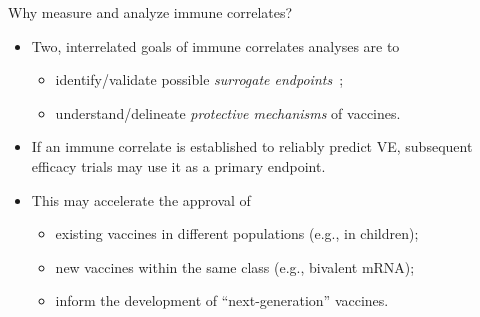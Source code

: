 \documentclass{beamer}
\begin{document}

\begin{frame}[c]{Why measure and analyze immune correlates?}

\begin{center}
\begin{itemize}
  \itemsep8pt
  \item Two, interrelated goals of immune correlates analyses are to
    \begin{itemize}
      \itemsep0pt
      \item identify/validate possible \textit{surrogate
        endpoints}~\citep{prentice1989surrogate};
      \item understand/delineate \textit{protective mechanisms} of vaccines.
    \end{itemize}
  \item If an immune correlate is established to reliably predict VE,
    subsequent efficacy trials may use it as a primary endpoint.
  \item This may accelerate the approval of
    \begin{itemize}
      \itemsep0pt
      \item existing vaccines in different populations (e.g., in children);
      \item new vaccines within the same class (e.g., bivalent mRNA);
      \item inform the development of ``next-generation'' vaccines.
    \end{itemize}
\end{itemize}
\end{center}

\note{
}

\end{frame}

\end{document}
